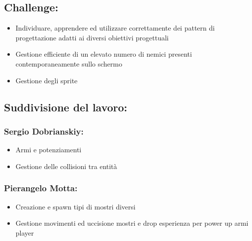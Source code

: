 \documentclass[a4paper,12pt]{report}
\begin{document}
\paragraph{}
\subsection*{Challenge:}
 
\begin{itemize}
	\item Individuare, apprendere ed utilizzare correttamente dei pattern di progettazione adatti ai diversi obiettivi progettuali
	\item Gestione efficiente di un elevato numero di nemici presenti contemporaneamente sullo schermo 
	\item Gestione degli sprite
\end{itemize}

\paragraph{}
\subsection*{Suddivisione del lavoro:}

\paragraph{}
\subsubsection*{Sergio Dobrianskiy:}

\begin{itemize}
	\item Armi e potenziamenti
	\item Gestione delle collisioni tra entità
\end{itemize}

\paragraph{}
\subsubsection*{Pierangelo Motta:}
\begin{itemize}
	\item Creazione e spawn tipi di mostri diversi
	\item Gestione movimenti ed uccisione mostri e drop esperienza per power up armi player
\end{itemize}
\end{document}
